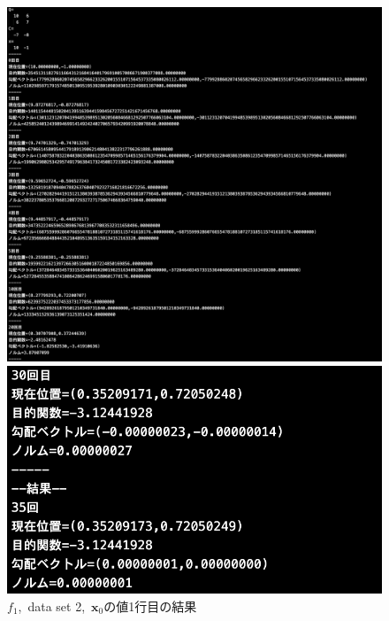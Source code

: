\documentclass[12pt]{jarticle}
\begin{document}
\clearpage
\begin{figure}[h]
    \begin{center}
        \includegraphics[scale=0.2]{kadai1_1s_out2_1_1.png}
    \end{center}
    \begin{center}
        \includegraphics[scale=0.4]{kadai1_1s_out2_1_2.png}
    \end{center}
    \caption{$f_1$,\ data set 2,\ $\boldsymbol{x}_0$の値1行目の結果}
\end{figure}
\end{document}
